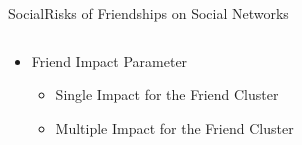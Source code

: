 \begin{frame}{Social}{Risks of Friendships on Social Networks \cite{akcora_risks_2012}}
\begin{columns}
\begin{column}{0.6\textwidth}
\begin{itemize}
\begin{itemize}
						\item Friend Impact Parameter
							\begin{itemize}
								\item Single Impact for the Friend Cluster
								\item Multiple Impact for the Friend Cluster
							\end{itemize}
							
					\end{itemize}
			\end{itemize}
			
		\end{column}
	\end{columns}
	

\end{frame}

